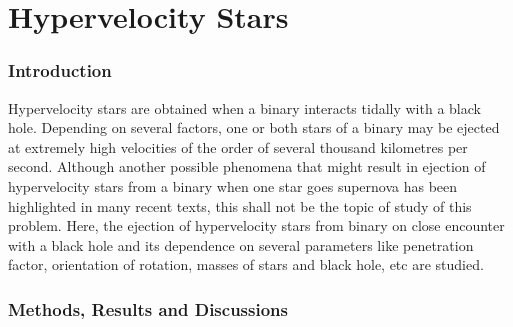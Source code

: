 \documentclass[a4paper]{article}
\begin{document}
	
	\setcounter{section}{0}
	\part{Hypervelocity Stars} \label{Problem3}


		\section{Introduction} \label{3:introduction}
		
		Hypervelocity stars are obtained when a binary interacts tidally with a black hole. Depending on several factors, one or both stars of a binary may be ejected at extremely high velocities of the order of several thousand kilometres per second. Although another possible phenomena that might result in ejection of hypervelocity stars from a binary when one star goes supernova has been highlighted in many recent texts, this shall not be the topic of study of this problem. Here, the ejection of hypervelocity stars from binary on close encounter with a black hole and its dependence on several parameters like penetration factor, orientation of rotation, masses of stars and black hole, etc are studied.

		
		\section{Methods, Results and Discussions}
		
\end{document}
